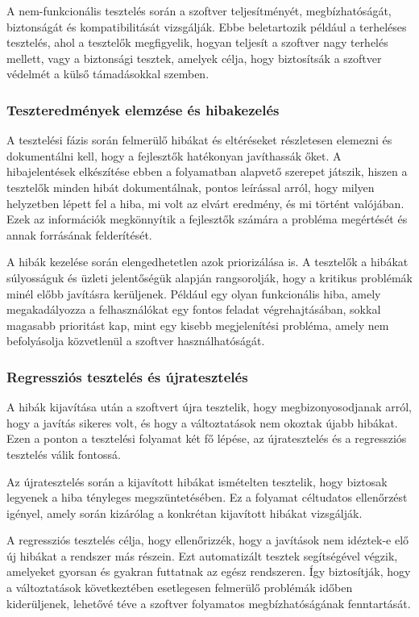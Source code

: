 A nem-funkcionális tesztelés során a szoftver teljesítményét, megbízhatóságát, biztonságát és kompatibilitását vizsgálják. Ebbe beletartozik például a terheléses tesztelés, ahol a tesztelők megfigyelik, hogyan teljesít a szoftver nagy terhelés mellett, vagy a biztonsági tesztek, amelyek célja, hogy biztosítsák a szoftver védelmét a külső támadásokkal szemben.

\subsubsection{Teszteredmények elemzése és hibakezelés}
A tesztelési fázis során felmerülő hibákat és eltéréseket részletesen elemezni és dokumentálni kell, hogy a fejlesztők hatékonyan javíthassák őket. A hibajelentések elkészítése ebben a folyamatban alapvető szerepet játszik, hiszen a tesztelők minden hibát dokumentálnak, pontos leírással arról, hogy milyen helyzetben lépett fel a hiba, mi volt az elvárt eredmény, és mi történt valójában. Ezek az információk megkönnyítik a fejlesztők számára a probléma megértését és annak forrásának felderítését.

A hibák kezelése során elengedhetetlen azok priorizálása is. A tesztelők a hibákat súlyosságuk és üzleti jelentőségük alapján rangsorolják, hogy a kritikus problémák minél előbb javításra kerüljenek. Például egy olyan funkcionális hiba, amely megakadályozza a felhasználókat egy fontos feladat végrehajtásában, sokkal magasabb prioritást kap, mint egy kisebb megjelenítési probléma, amely nem befolyásolja közvetlenül a szoftver használhatóságát.

\subsubsection{Regressziós tesztelés és újratesztelés}
A hibák kijavítása után a szoftvert újra tesztelik, hogy megbizonyosodjanak arról, hogy a javítás sikeres volt, és hogy a változtatások nem okoztak újabb hibákat. Ezen a ponton a tesztelési folyamat két fő lépése, az újratesztelés és a regressziós tesztelés válik fontossá.

Az újratesztelés során a kijavított hibákat ismételten tesztelik, hogy biztosak legyenek a hiba tényleges megszüntetésében. Ez a folyamat céltudatos ellenőrzést igényel, amely során kizárólag a konkrétan kijavított hibákat vizsgálják. 

A regressziós tesztelés célja, hogy ellenőrizzék, hogy a javítások nem idéztek-e elő új hibákat a rendszer más részein. Ezt automatizált tesztek segítségével végzik, amelyeket gyorsan és gyakran futtatnak az egész rendszeren. Így biztosítják, hogy a változtatások következtében esetlegesen felmerülő problémák időben kiderüljenek, lehetővé téve a szoftver folyamatos megbízhatóságának fenntartását.

